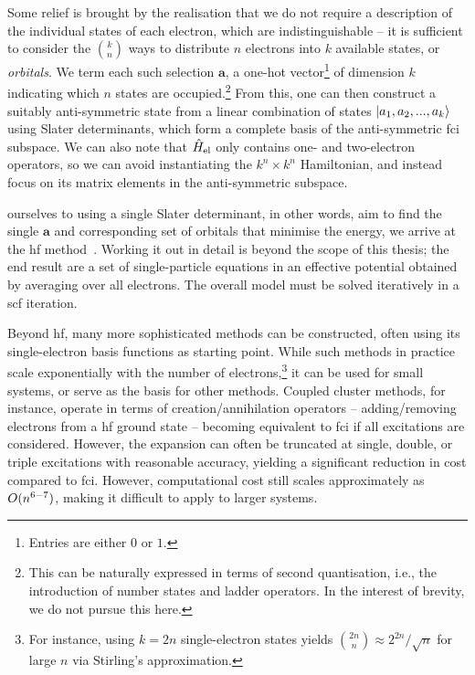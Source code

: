 Some relief is brought by the realisation that we do not require a description of the individual states of each electron, which are indistinguishable -- it is sufficient to consider the $\binom{k}{n}$ ways to distribute $n$ electrons into $k$ available states, or \emph{orbitals}. We term each such selection $\boldsymbol{a}$, a one-hot vector\footnote{Entries are either $0$ or $1$.} of dimension $k$ indicating which $n$ states are occupied.\footnote{This can be naturally expressed in terms of second quantisation, i.e., the introduction of number states and ladder operators. In the interest of brevity, we do not pursue this here.} From this, one can then construct a suitably anti-symmetric state from a linear combination of states $\ket{a_1, a_2, ..., a_k}$ using Slater determinants, which form a complete basis of the anti-symmetric \gls{fci} subspace. We can also note that $\hat H_{\text{el}}$ only contains one- and two-electron operators, so we can avoid instantiating the $k^n \times k^n$ Hamiltonian, and instead focus on its matrix elements in the anti-symmetric subspace.

 ourselves to using a single Slater determinant, in other words, aim to find the single $\boldsymbol{a}$ and corresponding set of orbitals that minimise the energy, we arrive at the \gls{hf} method~\cite{h1928p,f1930p}. Working it out in detail is beyond the scope of this thesis; the end result are a set of single-particle equations in an effective potential obtained by averaging over all electrons. The overall model must be solved iteratively in a \gls{scf} iteration.

Beyond \gls{hf}, many more sophisticated methods can be constructed, often using its single-electron basis functions as starting point. While such  methods in practice scale exponentially with the number of electrons,\footnote{For instance, using $k=2n$ single-electron states yields $\binom{2n}{n} \approx 2^{2n}/\sqrt{n}$ for large $n$ via Stirling's approximation.} it can be used for small systems, or serve as the basis for other methods. Coupled cluster methods, for instance, operate in terms of creation/annihilation operators -- adding/removing electrons from a \gls{hf} ground state -- becoming equivalent to \gls{fci} if all excitations are considered. However, the expansion can often be truncated at single, double, or triple excitations with reasonable accuracy, yielding a significant reduction in cost compared to \gls{fci}. However, computational cost still scales approximately as $O(n^{6-7})$, making it difficult to apply to larger systems.

